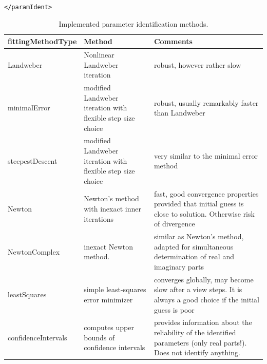 \begin{center}
\begin{minipage}{0.6\textwidth}
\begin{tabbing}
\verb!</paramIdent>!\\
\end{tabbing}
\end{minipage}
\end{center}


\begin{table}
\begin{center}
\begin{tabular}{|p{4cm}|p{4cm}|p{6cm}|}
\hline \hline {\bf fittingMethodType} & {\bf Method} & {\bf Comments}\\ 
\hline Landweber &  Nonlinear Landweber iteration & robust, however rather slow \\ 
\hline minimalError &  modified Landweber iteration with flexible step size choice & robust, usually remarkably faster than Landweber\\ 
\hline steepestDescent &  modified Landweber iteration with flexible step size choice  & very similar to the minimal error method \\ 
\hline Newton & Newton's method with inexact inner iterations & fast, good convergence properties provided that initial guess is close to solution. Otherwise risk of divergence \\ 
\hline NewtonComplex & inexact Newton method. & similar as Newton's method, adapted for simultaneous determination of real and imaginary parts \\
\hline leastSquares & simple least-squares error minimizer & converges globally, may become slow after a view steps. It is always a good choice if the initial guess is poor\\
\hline confidenceIntervals & computes upper bounds of confidence intervals& provides information about the reliability of the identified parameters (only real parts!). Does not identify anything.\\
\hline 
\end{tabular} 
\caption{Implemented parameter identification methods.}
\label{TableFittingMethods}
\end{center}

\end{table} 

